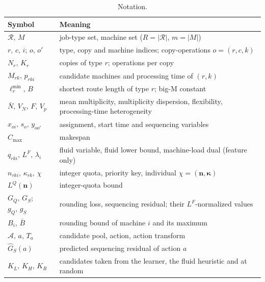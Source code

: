 \begin{table}
\centering\small
\caption{Notation.}\label{tab:notation}
\begin{tabularx}{\linewidth}{@{}>{\hsize}L>{\hsize}L@{}}
\toprule
\textbf{Symbol} & \textbf{Meaning} \\
\midrule
$\mathcal{R},\,M$ & job-type set, machine set ($R = \lvert\mathcal{R}\rvert$, $m = \lvert M\rvert$) \\
$r,\,c,\,i$; $o,\,o'$ & type, copy and machine indices; copy-operations $o = (r,c,k)$ \\
$N_r,\,K_r$ & copies of type $r$; operations per copy \\
$M_{rk},\,p_{rki}$ & candidate machines and processing time of $(r,k)$ \\
$\ell_r^{\min},\,B$ & shortest route length of type $r$; big-M constant \\
$\bar N,\,V_N,\,F,\,V_p$ & mean multiplicity, multiplicity dispersion, flexibility, processing-time heterogeneity \\
$x_{oi},\,s_o,\,y_{oo'}$ & assignment, start time and sequencing variables \\
$C_{\max}$ & makespan \\
$q_{rki},\,L^F,\,\lambda_i$ & fluid variable, fluid lower bound, machine-load dual (feature only) \\
$n_{rki},\,\kappa_{rk},\,\chi$ & integer quota, priority key, individual $\chi = (\mathbf{n}, \boldsymbol{\kappa})$ \\
$L^Q(\mathbf{n})$ & integer-quota bound \\
$G_Q,\,G_S$; $g_Q,\,g_S$ & rounding loss, sequencing residual; their $L^F$-normalized values \\
$B_i,\,\bar B$ & rounding bound of machine $i$ and its maximum \\
$\mathcal{A},\,a,\,T_a$ & candidate pool, action, action transform \\
$\hat G_S(a)$ & predicted sequencing residual of action $a$ \\
$K_L,\,K_H,\,K_R$ & candidates taken from the learner, the fluid heuristic and at random \\
\bottomrule
\end{tabularx}
\end{table}

